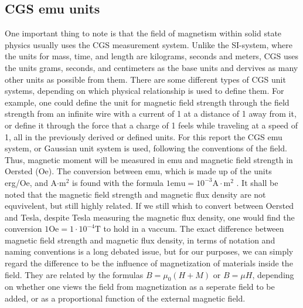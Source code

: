     \subsection{CGS emu units} \label{sec:cgs}
    One important thing to note is that the field of magnetism within solid state physics usually uses the CGS measurement system. Unlike the SI-system, where the units for mass, time, and length are kilograms, seconds and meters, CGS uses the units grams, seconds, and centimeters as the base units and dervives as many other units as possible from them. There are some different types of CGS unit systems, depending on which physical relationship is used to define them. For example, one could define the unit for magnetic field strength through the field strength from an infinite wire with a current of 1 at a distance of 1 away from it, or define it through the force that a charge of 1 feels while traveling at a speed of 1, all in the previously derived or defined units. For this report the CGS emu system, or Gaussian unit system is used, following the conventions of the field. Thus, magnetic moment will be measured in emu and magnetic field strength in Oersted (Oe). The conversion between emu, which is made up of the units erg/Oe, and A$\cdot \text{m}^2$ is found with the formula $1 \text{emu} = 10^{-3} \text{A}\cdot\text{m}^2$ \cite{nist_magnetic_units}. It shall be noted that the magnetic field strength and magnetic flux density are not equvivelent, but still highly related. If we still whish to convert between Oersted and Tesla, despite Tesla measuring the magnetic flux density, one would find the conversion $1 \text{Oe} = 1\cdot 10^{-4} \text{T}$ to hold in a vaccum. \cite{nist_magnetic_units} The exact difference between magnetic field strength and magnetic flux density, in terms of notation and naming conventions is a long debated issue, but for our purposes, we can simply regard the difference to be the influence of magnetization of materials inside the field. They are related by the formulas $B=\mu_0(H+M)$ or $B=\mu H$, depending on whether one views the field from magnetization as a seperate field to be added, or as a proportional function of the external magnetic field. \cite{roche2000b}

